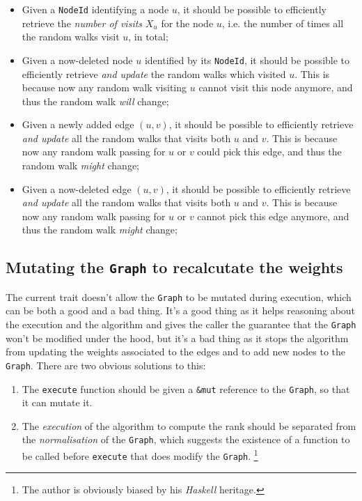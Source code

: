 \documentclass{article}
\begin{document}
\begin{itemize}
\item Given a \texttt{NodeId} identifying a node $u$, it should
      be possible to efficiently retrieve the \textit{number of visits}
      $X_u$ for the node $u$, i.e. the number of times all the random walks
      visit $u$, in total;
\item Given a now-deleted node $u$ identified by its \texttt{NodeId},
      it should be possible to efficiently retrieve \textit{and
      update} the random walks which visited $u$. This is because now
      any random walk visiting $u$ cannot visit this node anymore, and
      thus the random walk \textit{will} change;
\item Given a newly added edge $(u, v)$, it should be possible to
      efficiently retrieve \textit{and update} all the random walks
      that visits both $u$ and $v$. This is because now any random
      walk passing for $u$ or $v$ could pick this edge, and thus the
      random walk \textit{might} change;
\item Given a now-deleted edge $(u, v)$, it should be possible to
      efficiently retrieve \textit{and update} all the random walks
      that visits both $u$ and $v$. This is because now any random
      walk passing for $u$ or $v$ cannot pick this edge anymore, and
      thus the random walk \textit{might} change;
\end{itemize}

\subsection{Mutating the \texttt{Graph} to recalcutate the weights}

The current trait doesn't allow the \texttt{Graph} to be mutated
during execution, which can be both a good and a bad thing. It's
a good thing as it helps reasoning about the execution and the
algorithm and gives the caller the guarantee that the \texttt{Graph}
won't be modified under the hood, but it's a bad thing as it stops
the algorithm from updating the weights associated to the edges
and to add new nodes to the \texttt{Graph}. There are two obvious
solutions to this:

\begin{enumerate}
\item The \texttt{execute} function should be given a \texttt{\&mut}
      reference to the \texttt{Graph}, so that it can mutate it.
\item The \textit{execution} of the algorithm to compute the rank
      should be separated from the \textit{normalisation} of the
      \texttt{Graph}, which suggests the existence of a function
      to be called before \texttt{execute} that does modify the
      \texttt{Graph}. \footnote{The author is obviously biased by his \textit{Haskell} heritage.}
\end{enumerate}
\end{document}
